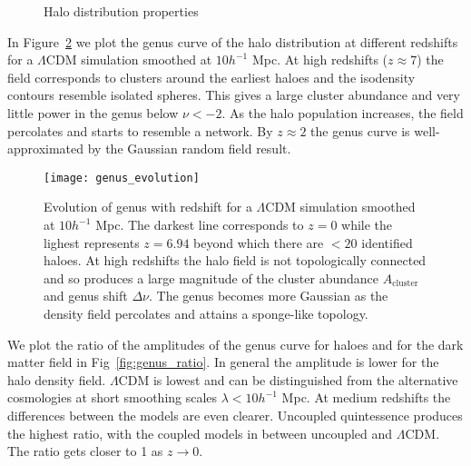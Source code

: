    \begin{figure}
     \hfill
     \caption{Halo distribution properties}
     \label{fig:halo_props}
   \end{figure}
In Figure~\ref{fig:genus_evolution} we plot the genus curve of the halo distribution at different redshifts for a $\Lambda$CDM simulation smoothed at $10 h^{-1}$ Mpc. At high redshifts ($z \approx 7$) the field corresponds to clusters around the earliest haloes and the isodensity contours resemble isolated spheres. This gives a large cluster abundance and very little power in the genus below $\nu < -2$. As the halo population increases, the field percolates and starts to resemble a network. By $z \approx 2$ the genus curve is well-approximated by the Gaussian random field result.

\begin{figure}
	\centering
	\texttt{[image: genus\_evolution]}
    \caption{Evolution of genus with redshift for a $\Lambda$CDM simulation smoothed at $10 h^{-1}$ Mpc. The darkest line corresponds to $z=0$ while the lighest represents $z=6.94$ beyond which there are $<20$ identified haloes. At high redshifts the halo field is not topologically connected and so produces a large magnitude of the cluster abundance $A_{\mathrm{cluster}}$ and genus shift $\Delta \nu$. The genus becomes more Gaussian as the density field percolates and attains a sponge-like topology.}
    \label{fig:genus_evolution}
\end{figure}
We plot the ratio of the amplitudes of the genus curve for haloes and for the dark matter field in Fig~\ref{fig:genus_ratio}. In general the amplitude is lower for the halo density field. $\Lambda$CDM is lowest and can be distinguished from the alternative cosmologies at short smoothing scales $\lambda < 10 h^{-1}$ Mpc. At medium redshifts the differences between the models are even clearer. Uncoupled quintessence produces the highest ratio, with the coupled models in between uncoupled and $\Lambda$CDM. The ratio gets closer to 1 as $z \to 0$.

